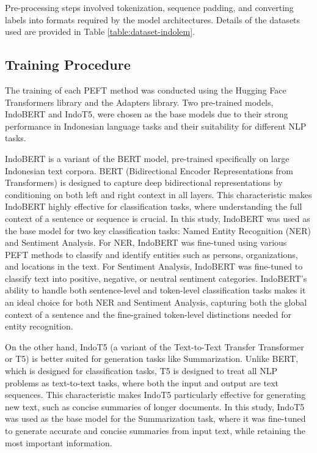 Pre-processing steps involved tokenization, sequence padding, and converting labels into formats required by the model architectures. Details of the datasets used are provided in Table \ref{table:dataset-indolem}.

\subsection{Training Procedure}

The training of each PEFT method was conducted using the Hugging Face Transformers library and the Adapters library. Two pre-trained models, IndoBERT and IndoT5, were chosen as the base models due to their strong performance in Indonesian language tasks and their suitability for different NLP tasks.

IndoBERT is a variant of the BERT model, pre-trained specifically on large Indonesian text corpora. BERT (Bidirectional Encoder Representations from Transformers) is designed to capture deep bidirectional representations by conditioning on both left and right context in all layers. This characteristic makes IndoBERT highly effective for classification tasks, where understanding the full context of a sentence or sequence is crucial. In this study, IndoBERT was used as the base model for two key classification tasks: Named Entity Recognition (NER) and Sentiment Analysis. For NER, IndoBERT was fine-tuned using various PEFT methods to classify and identify entities such as persons, organizations, and locations in the text. For Sentiment Analysis, IndoBERT was fine-tuned to classify text into positive, negative, or neutral sentiment categories. IndoBERT’s ability to handle both sentence-level and token-level classification tasks makes it an ideal choice for both NER and Sentiment Analysis, capturing both the global context of a sentence and the fine-grained token-level distinctions needed for entity recognition.

On the other hand, IndoT5 (a variant of the Text-to-Text Transfer Transformer or T5) is better suited for generation tasks like Summarization. Unlike BERT, which is designed for classification tasks, T5 is designed to treat all NLP problems as text-to-text tasks, where both the input and output are text sequences. This characteristic makes IndoT5 particularly effective for generating new text, such as concise summaries of longer documents. In this study, IndoT5 was used as the base model for the Summarization task, where it was fine-tuned to generate accurate and concise summaries from input text, while retaining the most important information.

